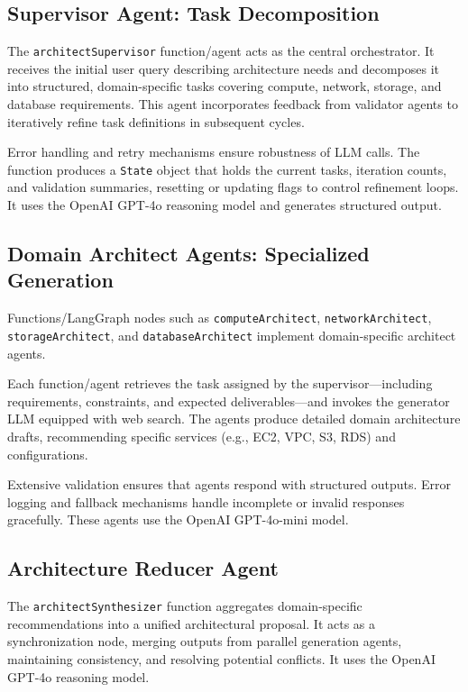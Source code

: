 \subsection{Supervisor Agent: Task Decomposition}

The \texttt{architectSupervisor} function/agent acts as the central orchestrator. It receives the initial user query describing architecture needs and decomposes it into structured, domain-specific tasks covering compute, network, storage, and database requirements. This agent incorporates feedback from validator agents to iteratively refine task definitions in subsequent cycles.

Error handling and retry mechanisms ensure robustness of LLM calls. The function produces a \texttt{State} object that holds the current tasks, iteration counts, and validation summaries, resetting or updating flags to control refinement loops. It uses the OpenAI GPT-4o reasoning model and generates structured output.

\subsection{Domain Architect Agents: Specialized Generation}

Functions/LangGraph nodes such as \texttt{computeArchitect}, \texttt{networkArchitect}, \texttt{storageArchitect}, and \texttt{databaseArchitect} implement domain-specific architect agents.

Each function/agent retrieves the task assigned by the supervisor—including requirements, constraints, and expected deliverables—and invokes the generator LLM equipped with web search. The agents produce detailed domain architecture drafts, recommending specific services (e.g., EC2, VPC, S3, RDS) and configurations.

Extensive validation ensures that agents respond with structured outputs. Error logging and fallback mechanisms handle incomplete or invalid responses gracefully. These agents use the OpenAI GPT-4o-mini model.

\subsection{Architecture Reducer Agent}

The \texttt{architectSynthesizer} function aggregates domain-specific recommendations into a unified architectural proposal. It acts as a synchronization node, merging outputs from parallel generation agents, maintaining consistency, and resolving potential conflicts. It uses the OpenAI GPT-4o reasoning model.

